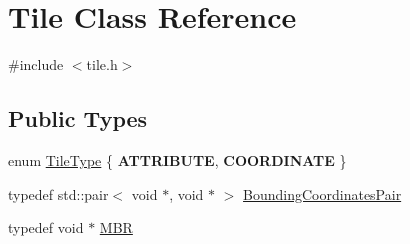 \hypertarget{classTile}{}\section{Tile Class Reference}
\label{classTile}


{\ttfamily \#include $<$tile.\+h$>$}

\subsection*{Public Types}
\begin{DoxyCompactItemize}
\item 
enum \hyperlink{classTile_a4d24e5edfa7092e2fd2d0f772e3e1433}{Tile\+Type} \{ {\bfseries A\+T\+T\+R\+I\+B\+U\+T\+E}, 
{\bfseries C\+O\+O\+R\+D\+I\+N\+A\+T\+E}
 \}
\item 
typedef std\+::pair$<$ void $\ast$, void $\ast$ $>$ \hyperlink{classTile_a7103069b7ba05d1032733e3a026b8632}{Bounding\+Coordinates\+Pair}
\item 
typedef void $\ast$ \hyperlink{classTile_a0b0f911c937d339ce110c18a2d015a4d}{M\+B\+R}
\end{DoxyCompactItemize}
